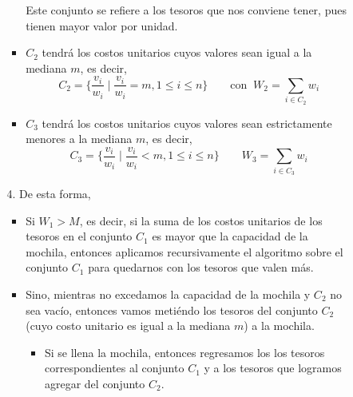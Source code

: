 \documentclass[letterpaper,11pt]{article}
\begin{document}
\begin{enumerate}
\begin{itemize}
\begin{itemize}
\begin{itemize}
                Este conjunto se refiere a los tesoros que nos conviene tener, 
                pues tienen mayor valor por unidad.

                \item $C_2$ tendrá los costos unitarios cuyos valores sean 
                igual a la mediana $m$, es decir, 
                \begin{equation*}
                    C_2 = \{\frac{v_i}{w_i} \; | \; \frac{v_i}{w_i} = m, 
                    1 \leq i \leq n\}
                    \quad \quad \text{con} \; \; 
                    W_2 = \sum_{i \in C_2} w_i
                \end{equation*}

                \item $C_3$ tendrá los costos unitarios cuyos valores sean 
                estrictamente menores a la mediana $m$, es decir, 
                \begin{equation*}
                    C_3 = \{\frac{v_i}{w_i} \; | \; \frac{v_i}{w_i} < m, 
                    1 \leq i \leq n\}
                    \quad \quad 
                    W_3 = \sum_{i \in C_3} w_i
                \end{equation*}
            \end{itemize}

            \item[4.] De esta forma, 
            \begin{itemize}
                \item Si $W_1 > M$, es decir, si la suma de los costos 
                unitarios de los tesoros en el conjunto $C_1$ es mayor que la 
                capacidad de la mochila, entonces aplicamos recursivamente 
                el algoritmo sobre el conjunto $C_1$ para quedarnos con los 
                tesoros que valen más.
                
                \item Sino, mientras no excedamos la capacidad de la mochila 
                y $C_2$ no sea vacío, entonces vamos metiéndo los tesoros del 
                conjunto $C_2$ (cuyo costo unitario es igual a la mediana $m$)
                a la mochila.
                \begin{itemize}
                    \item Si se llena la mochila, entonces regresamos los 
                    los tesoros correspondientes al conjunto $C_1$ y a los 
                    tesoros que logramos agregar del conjunto $C_2$.


\end{itemize}
\end{itemize}
\end{itemize}
\end{itemize}
\end{enumerate}
\end{document}

